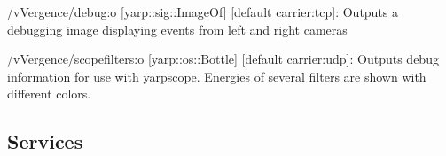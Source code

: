 \begin{DoxyItemize}
\item /v\+Vergence/debug\+:o \mbox{[}yarp\+::sig\+::\+Image\+Of\mbox{]} \mbox{[}default carrier\+:tcp\mbox{]}\+: Outputs a debugging image displaying events from left and right cameras
\item /v\+Vergence/scopefilters\+:o \mbox{[}yarp\+::os\+::\+Bottle\mbox{]} \mbox{[}default carrier\+:udp\mbox{]}\+: Outputs debug information for use with yarpscope. Energies of several filters are shown with different colors.
\end{DoxyItemize}\hypertarget{group__zynqGrabber_services_sec}{}\subsection{Services}\label{group__zynqGrabber_services_sec}
